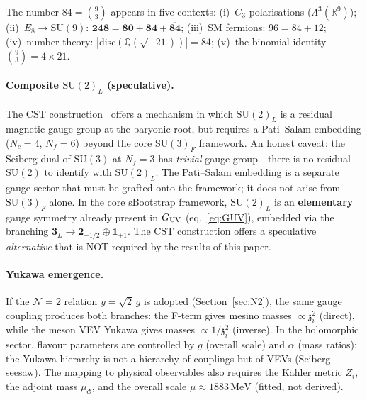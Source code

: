 \documentclass[aps,prd,twocolumn,showpacs,preprintnumbers,superscriptaddress,floatfix]{revtex4-2}
\newcommand{\SU}{\mathrm{SU}}
\newcommand{\Nf}{N_{\!f}}
\newcommand{\Nc}{N_{\!c}}
\newcommand{\MeV}{\,\mathrm{MeV}}
\newcommand{\zch}{\mathfrak{z}}
\begin{document}
The number $84 = \binom{9}{3}$ appears in five contexts:
(i)~$C_3$ polarisations ($\Lambda^3(\mathbb{R}^9)$);
(ii)~$E_8 \to \SU(9)$: $\mathbf{248} = \mathbf{80} + \mathbf{84} + \overline{\mathbf{84}}$;
(iii)~SM fermions: $96 = 84 + 12$;
(iv)~number theory: $|\text{disc}(\mathbb{Q}(\sqrt{-21}))| = 84$;
(v)~the binomial identity $\binom{9}{3} = 4 \times 21$.

\paragraph{Composite $\SU(2)_L$ (speculative).}
The CST construction~\cite{Csaki:2011xn} offers a mechanism in
which $\SU(2)_L$ is a residual magnetic gauge group at the
baryonic root, but requires a Pati--Salam embedding
($\Nc = 4$, $\Nf = 6$) beyond the core $\SU(3)_F$ framework.
An honest caveat: the Seiberg dual of $\SU(3)$ at $\Nf = 3$
has \emph{trivial} gauge group---there is no residual $\SU(2)$
to identify with $\SU(2)_L$.
The Pati--Salam embedding is a separate gauge sector that must
be grafted onto the framework; it does not arise from
$\SU(3)_F$ alone.
In the core sBootstrap framework, $\SU(2)_L$ is an
\textbf{elementary} gauge symmetry already present in
$G_{\rm UV}$ (eq.~\eqref{eq:GUV}), embedded via the branching
$\mathbf{3}_L \to \mathbf{2}_{-1/2} \oplus \mathbf{1}_{+1}$.
The CST construction offers a speculative \emph{alternative}
that is NOT required by the results of this paper.

\paragraph{Yukawa emergence.}
If the $\mathcal{N}{=}2$ relation $y = \sqrt{2}\,g$ is adopted
(Section~\ref{sec:N2}), the same gauge coupling produces both
branches: the F-term gives mesino masses $\propto \zch_i^2$
(direct), while the meson VEV Yukawa gives masses
$\propto 1/\zch_i^2$ (inverse).
In the holomorphic sector, flavour parameters are controlled by
$g$ (overall scale) and $\alpha$ (mass ratios); the Yukawa
hierarchy is not a hierarchy of couplings but of VEVs (Seiberg
seesaw).
The mapping to physical observables also requires the K\"ahler
metric $Z_i$, the adjoint mass $\mu_\Phi$, and the overall scale
$\mu \approx 1883\MeV$ (fitted, not derived).
\end{document}
